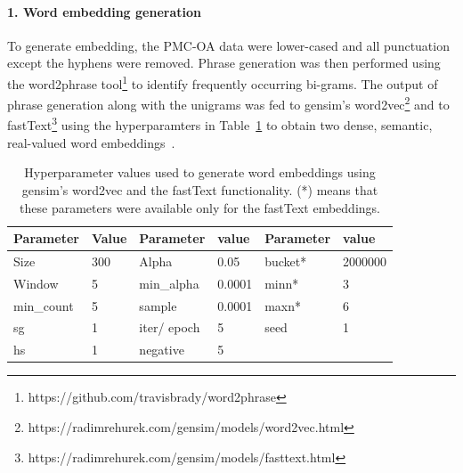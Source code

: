 \documentclass{IOS-Book-Article}
\begin{document}
\paragraph{1. Word embedding generation}
%
To generate embedding, the PMC-OA data were lower-cased and all punctuation except the hyphens were removed.
Phrase generation was then performed using the word2phrase tool\footnote{https://github.com/travisbrady/word2phrase} to identify frequently occurring bi-grams.
The output of phrase generation along with the unigrams was fed to gensim's word2vec\footnote{https://radimrehurek.com/gensim/models/word2vec.html} and to fastText\footnote{https://radimrehurek.com/gensim/models/fasttext.html} using the hyperparamters in Table~\ref{table:1} to obtain two dense, semantic, real-valued word embeddings~\cite{Goldberg2015-qv}.
%
\vspace{1em}
\begin{table}[h!]
\centering
\begin{tabular}{p{1.5cm}p{1cm}p{1.5cm}p{1cm}p{1.5cm}p{1cm}  }
 Parameter & Value & Parameter & value & Parameter & value\\
 \hline
 Size   & 300    & Alpha &   0.05 & bucket* & 2000000\\
 Window & 5  & min\_alpha   & 0.0001 & minn* & 3\\
 min\_count  & 5 & sample  &  0.0001 & maxn*   & 6 \\
 sg & 1 & iter/ epoch &  5 & seed & 1\\
 hs & 1  & negative & 5 & & \\ 
 \hline
\end{tabular}
\vspace{1em}
\caption{Hyperparameter values used to generate word embeddings using gensim's word2vec and the fastText functionality. (*) means that these parameters were available only for the fastText embeddings.}
\label{table:1}
\end{table}
%
\end{document}
